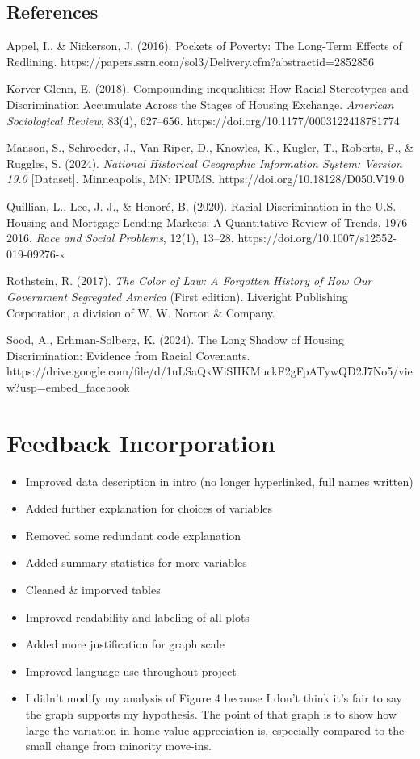 \documentclass[11pt]{article}
\providecommand{\tightlist}{%
      \setlength{\itemsep}{0pt}\setlength{\parskip}{0pt}}
\begin{document}
    \subsection{References}\label{references}

    Appel, I., \& Nickerson, J. (2016). Pockets of Poverty: The Long-Term
Effects of Redlining.
https://papers.ssrn.com/sol3/Delivery.cfm?abstractid=2852856

Korver-Glenn, E. (2018). Compounding inequalities: How Racial
Stereotypes and Discrimination Accumulate Across the Stages of Housing
Exchange. \emph{American Sociological Review}, 83(4), 627--656.
https://doi.org/10.1177/0003122418781774

Manson, S., Schroeder, J., Van Riper, D., Knowles, K., Kugler, T.,
Roberts, F., \& Ruggles, S. (2024). \emph{National Historical Geographic
Information System: Version 19.0} {[}Dataset{]}. Minneapolis, MN: IPUMS.
https://doi.org/10.18128/D050.V19.0

Quillian, L., Lee, J. J., \& Honoré, B. (2020). Racial Discrimination in
the U.S. Housing and Mortgage Lending Markets: A Quantitative Review of
Trends, 1976--2016. \emph{Race and Social Problems}, 12(1), 13--28.
https://doi.org/10.1007/s12552-019-09276-x

Rothstein, R. (2017). \emph{The Color of Law: A Forgotten History of How
Our Government Segregated America} (First edition). Liveright Publishing
Corporation, a division of W. W. Norton \& Company.

Sood, A., Erhman-Solberg, K. (2024). The Long Shadow of Housing
Discrimination: Evidence from Racial Covenants.
https://drive.google.com/file/d/1uLSaQxWiSHKMuckF2gFpATywQD2J7No5/view?usp=embed\_facebook
\appendix

    \section{Feedback Incorporation}\label{feedback-incorporation}

    \begin{itemize}
\tightlist
\item
  Improved data description in intro (no longer hyperlinked, full names
  written)
\item
  Added further explanation for choices of variables
\item
  Removed some redundant code explanation
\item
  Added summary statistics for more variables
\item
  Cleaned \& imporved tables
\item
  Improved readability and labeling of all plots
\item
  Added more justification for graph scale
\item
  Improved language use throughout project
\item
  I didn't modify my analysis of Figure 4 because I don't think it's
  fair to say the graph supports my hypothesis. The point of that graph
  is to show how large the variation in home value appreciation is,
  especially compared to the small change from minority move-ins.
\end{itemize}


    
    
    
\end{document}
